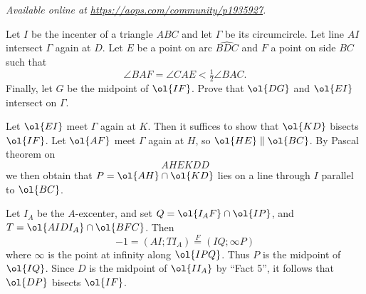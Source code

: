 \textsl{Available online at \url{https://aops.com/community/p1935927}.}
\begin{mdframed}[style=mdpurplebox,frametitle={Problem statement}]
Let $I$ be the incenter of a triangle $ABC$ and let $\Gamma$ be its circumcircle.
Let line $AI$ intersect $\Gamma$ again at $D$.
Let $E$ be a point on arc $\widehat{BDC}$ and $F$ a point on side $BC$ such that
\[ \angle BAF = \angle CAE < \tfrac12 \angle BAC. \]
Finally, let $G$ be the midpoint of $\ol{IF}$.
Prove that $\ol{DG}$ and $\ol{EI}$ intersect on $\Gamma$.
\end{mdframed}
Let $\ol{EI}$ meet $\Gamma$ again at $K$.
Then it suffices to show that $\ol{KD}$ bisects $\ol{IF}$.
Let $\ol{AF}$ meet $\Gamma$ again at $H$, so $\ol{HE} \parallel \ol{BC}$.
By Pascal theorem on \[ AHEKDD \]
we then obtain that $P = \ol{AH} \cap \ol{KD}$ lies on a line through $I$
parallel to $\ol{BC}$.

Let $I_A$ be the $A$-excenter,
and set $Q = \ol{I_AF} \cap \ol{IP}$, and $T = \ol{AIDI_A} \cap \ol{BFC}$.
Then
\[ -1 = (AI;TI_A) \overset{F} = (IQ;\infty P) \]
where $\infty$ is the point at infinity along $\ol{IPQ}$.
Thus $P$ is the midpoint of $\ol{IQ}$.
Since $D$ is the midpoint of $\ol{II_A}$ by ``Fact 5'',
it follows that $\ol{DP}$ bisects $\ol{IF}$.

